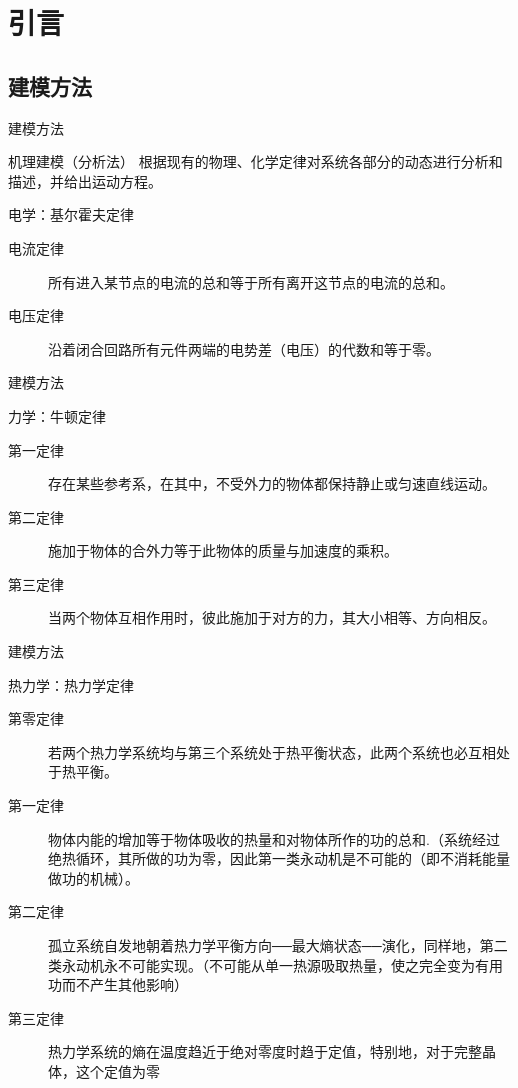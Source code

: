 \documentclass[handout,cjkutf8,table,aspectratio=1610]{beamer} %
\begin{document}
\section{引言}
\subsection{建模方法}
\begin{frame}{建模方法}
\begin{block}{机理建模（分析法）}
根据现有的物理、化学定律对系统各部分的动态进行分析和描述，并给出运动方程。
\end{block}
\begin{block}{电学：基尔霍夫定律}
\begin{description}
\item[电流定律] 所有进入某节点的电流的总和等于所有离开这节点的电流的总和。
\item[电压定律] 沿着闭合回路所有元件两端的电势差（电压）的代数和等于零。
\end{description}
\end{block}
\end{frame}

\begin{frame}{建模方法}
\begin{block}{力学：牛顿定律}
\begin{description}
\item[第一定律]存在某些参考系，在其中，不受外力的物体都保持静止或匀速直线运动。
\item[第二定律]施加于物体的合外力等于此物体的质量与加速度的乘积。
\item[第三定律]当两个物体互相作用时，彼此施加于对方的力，其大小相等、方向相反。
\end{description}
\end{block}
\end{frame}

\begin{frame}{建模方法}
\begin{block}{热力学：热力学定律}
\begin{description}
\item[第零定律]若两个热力学系统均与第三个系统处于热平衡状态，此两个系统也必互相处于热平衡。
\item [第一定律]物体内能的增加等于物体吸收的热量和对物体所作的功的总和.（系统经过绝热循环，其所做的功为零，因此第一类永动机是不可能的（即不消耗能量做功的机械）。
\item [第二定律]孤立系统自发地朝着热力学平衡方向──最大熵状态──演化，同样地，第二类永动机永不可能实现。（不可能从单一热源吸取热量，使之完全变为有用功而不产生其他影响）
\item [第三定律]热力学系统的熵在温度趋近于绝对零度时趋于定值，特别地，对于完整晶体，这个定值为零
\end{description}
\end{block}
\end{frame}
\end{document}
